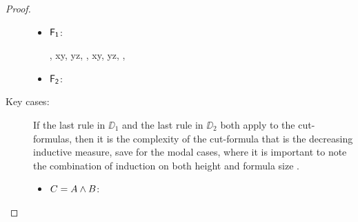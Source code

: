 \documentclass[a4paper]{article}
\begin{document}
\begin{proof}
\begin{description}
\begin{itemize}
\item$\mathsf{F_1}$:
\begin{smallequation*}
	{\B, \accs xy, \futs yz, \Left \SEQ \Right}
	{
		{\B, \accs xy, \futs yz, \Left \SEQ \Right, }
		{}}
	{}
\end{smallequation*}

\item$\mathsf{F_2}$:
\begin{smallequation*}
	{}
	{}
\end{smallequation*}

\end{itemize}
\item[Key cases:]\label{key-cases}
If the last rule in $\DD_1$ and the last rule in $\DD_2$ both apply to the cut-formulas, then it is the complexity of the cut-formula that is the decreasing inductive measure, save for the modal cases, where it is important to note the combination of induction on both height and formula size . 
\begin{itemize}
	\item $C=A \mathbin{\wedge} B$:
	

\end{itemize}
\end{description}
\end{proof}
\end{document}
